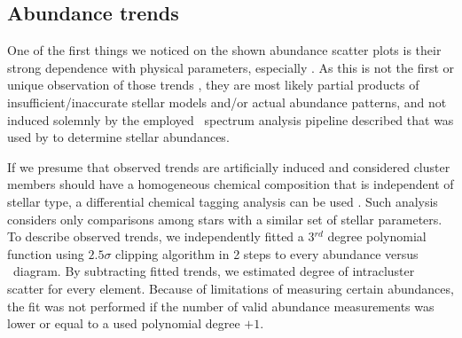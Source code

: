 \subsection{Abundance trends}
\label{sec:abund_trends}
One of the first things we noticed on the shown abundance scatter plots is their strong dependence with physical parameters, especially \Teff. As this is not the first or unique observation of those trends \cite{2010A&A...523A..71G, 2013ApJ...775...58B, 2016MNRAS.457.3934L, 2018A&A...619A.176B, 2019arXiv191208539C}, they are most likely partial products of insufficient/inaccurate stellar models and/or actual abundance patterns, and not induced solemnly by the employed \SME\ spectrum analysis pipeline described that was used by \citet{buder2020} to determine stellar abundances.

If we presume that observed trends are artificially induced and considered cluster members should have a homogeneous chemical composition that is independent of stellar type, a differential chemical tagging analysis can be used \cite{2019arXiv191208539C}. Such analysis considers only comparisons among stars with a similar set of stellar parameters. To describe observed trends, we independently fitted a 3$^{rd}$ degree polynomial function using $2.5\sigma$ clipping algorithm in 2 steps to every abundance versus \Teff\ diagram. By subtracting fitted trends, we estimated degree of intracluster scatter for every element. Because of limitations of measuring certain abundances, the fit was not performed if the number of valid abundance measurements was lower or equal to a used polynomial degree $+1$.


